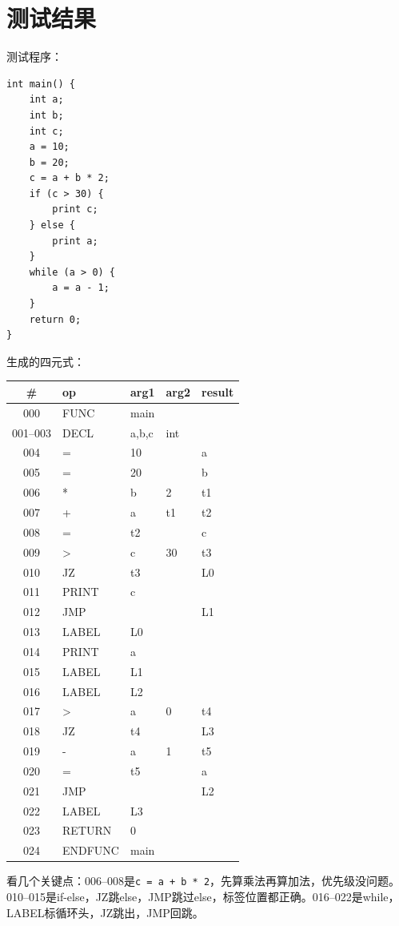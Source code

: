 \documentclass[12pt,a4paper]{ctexart}
\begin{document}
\section{测试结果}

测试程序：

\begin{lstlisting}[language={}]
int main() {
    int a;
    int b;
    int c;
    a = 10;
    b = 20;
    c = a + b * 2;
    if (c > 30) {
        print c;
    } else {
        print a;
    }
    while (a > 0) {
        a = a - 1;
    }
    return 0;
}
\end{lstlisting}

生成的四元式：

\begin{table}[h]
\centering
\begin{tabular}{cllll}
\toprule
\# & op & arg1 & arg2 & result \\
\midrule
000 & FUNC & main & & \\
001--003 & DECL & a,b,c & int & \\
004 & = & 10 & & a \\
005 & = & 20 & & b \\
006 & * & b & 2 & t1 \\
007 & + & a & t1 & t2 \\
008 & = & t2 & & c \\
009 & > & c & 30 & t3 \\
010 & JZ & t3 & & L0 \\
011 & PRINT & c & & \\
012 & JMP & & & L1 \\
013 & LABEL & L0 & & \\
014 & PRINT & a & & \\
015 & LABEL & L1 & & \\
016 & LABEL & L2 & & \\
017 & > & a & 0 & t4 \\
018 & JZ & t4 & & L3 \\
019 & - & a & 1 & t5 \\
020 & = & t5 & & a \\
021 & JMP & & & L2 \\
022 & LABEL & L3 & & \\
023 & RETURN & 0 & & \\
024 & ENDFUNC & main & & \\
\bottomrule
\end{tabular}
\end{table}

看几个关键点：006--008是\texttt{c = a + b * 2}，先算乘法再算加法，优先级没问题。010--015是if-else，JZ跳else，JMP跳过else，标签位置都正确。016--022是while，LABEL标循环头，JZ跳出，JMP回跳。
\end{document}
